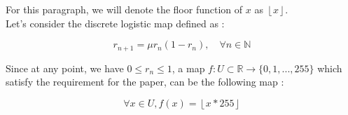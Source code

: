 For this paragraph, we will denote the floor function of $x$ as $\left\lfloor x \right\rfloor$. \\

Let's consider the discrete logistic map defined as : 

\begin{equation*}
	r_{n+1} = \mu r_n (1-r_n), \quad \forall n \in \mathbb{N}
\end{equation*}

Since at any point, we have $0 \leq r_n \leq 1$, a map $f:U \subset \mathbb{R} \rightarrow \{0,1,...,255\}$ which satisfy the requirement for the paper, can be the following map :

\begin{equation*}
	\forall x \in U, f(x) = \left \lfloor x * 255 \right \rfloor
\end{equation*}
